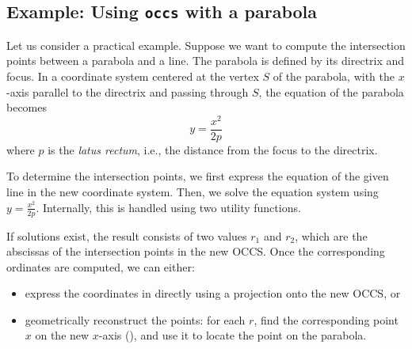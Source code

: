 \subsection{Example: Using \texttt{occs} with a parabola}

Let us consider a practical example. Suppose we want to compute the intersection points between a parabola and a line. The parabola is defined by its directrix and focus. In a coordinate system centered at the vertex $S$ of the parabola, with the $x$-axis parallel to the directrix and passing through $S$, the equation of the parabola becomes
\[
y = \frac{x^2}{2p}
\]
where $p$ is the \emph{latus rectum}, i.e., the distance from the focus to the directrix.

\vspace{1em}

To determine the intersection points, we first express the equation of the given line in the new coordinate system. Then, we solve the equation system using $y = \frac{x^2}{2p}$. Internally, this is handled using two utility functions.

\vspace{1em}

If solutions exist, the result consists of two values $r_1$ and $r_2$, which are the abscissas of the intersection points in the new OCCS. Once the corresponding ordinates are computed, we can either:
\begin{itemize}
  \item express the coordinates in \TIKZ{} directly using a projection onto the new OCCS, or
  \item geometrically reconstruct the points: for each $r$, find the corresponding point $x$ on the new $x$-axis (), and use it to locate the point on the parabola.
\end{itemize}


